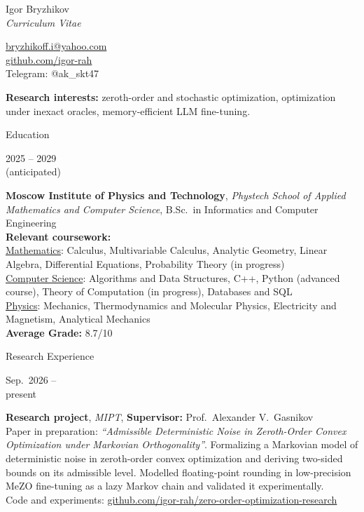 \documentclass[10pt,a4paper]{article}
\newlength{\datecol}\setlength{\datecol}{2.3cm}
\newcommand{\cvsection}[1]{%
  \vspace{3pt}%
  \noindent\makebox[\datecol][r]{\color{accent}\rule[0.25ex]{\datecol}{3pt}}\hspace{6pt}%
  {\color{accent}\Large #1}\par\vspace{2pt}}
\newlength{\bodycol}
\newcommand{\cventry}[2]{%
  \setlength{\bodycol}{\dimexpr\linewidth-\datecol-6pt\relax}%
  \noindent\parbox[t]{\datecol}{\raggedleft\small\strut #1}\hspace{6pt}%
  \parbox[t]{\bodycol}{\strut #2}\par\vspace{2pt}}
\begin{document}
\begin{minipage}[t]{0.55\linewidth}
  {\fontsize{27}{29}\selectfont Igor Bryzhikov}\\[4pt]
  {\Large\itshape\color{gray} Curriculum Vitae}
\end{minipage}%
\begin{minipage}[t]{0.45\linewidth}
  \raggedleft\small
  \href{mailto:bryzhikoff.i@yahoo.com}{bryzhikoff.i@yahoo.com}\\
  \href{https://github.com/igor-rah}{github.com/igor-rah}\\
  Telegram: @ak\_skt47
\end{minipage}

\vspace{4pt}
\cventry{}{\textbf{Research interests:} zeroth-order and stochastic optimization, optimization under inexact oracles, memory-efficient LLM fine-tuning.}

\cvsection{Education}
\cventry{2025 -- 2029\\(anticipated)}{%
  \textbf{Moscow Institute of Physics and Technology}, \textit{Phystech School of Applied Mathematics and Computer Science}, B.Sc.\ in Informatics and Computer Engineering\\
  \textbf{Relevant coursework:}\\
  \underline{Mathematics}: Calculus, Multivariable Calculus, Analytic Geometry, Linear Algebra, Differential Equations, Probability Theory (in progress)\\
  \underline{Computer Science}: Algorithms and Data Structures, C++, Python (advanced course), Theory of Computation (in progress), Databases and SQL\\
  \underline{Physics}: Mechanics, Thermodynamics and Molecular Physics, Electricity and Magnetism, Analytical Mechanics\\
  \textbf{Average Grade:} 8.7/10}

\cvsection{Research Experience}
\cventry{Sep.\ 2026 --\\present}{%
  \textbf{Research project}, \textit{MIPT}, \textbf{Supervisor:} Prof.\ Alexander V.\ Gasnikov\\
  Paper in preparation: \textit{``Admissible Deterministic Noise in Zeroth-Order Convex Optimization under Markovian Orthogonality''}. Formalizing a Markovian model of deterministic noise in zeroth-order convex optimization and deriving two-sided bounds on its admissible level. Modelled floating-point rounding in low-precision MeZO fine-tuning as a lazy Markov chain and validated it experimentally.\\
  Code and experiments: \href{https://github.com/igor-rah/zero-order-optimization-research}{github.com/igor-rah/zero-order-optimization-research}}
\end{document}
